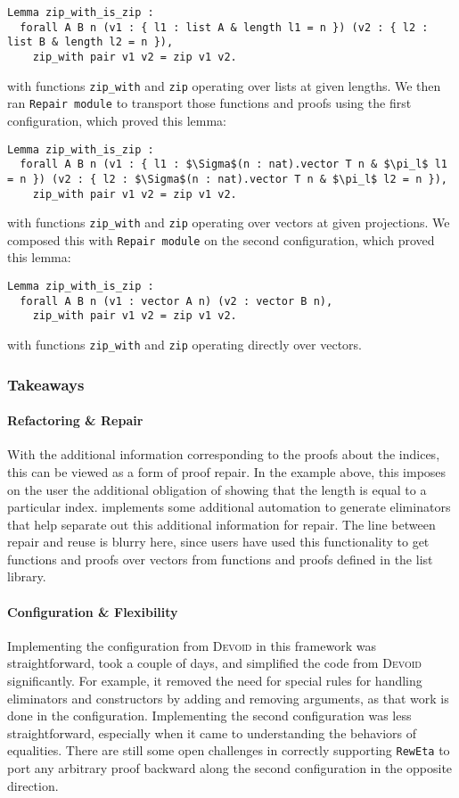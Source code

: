 \begin{lstlisting}
Lemma zip_with_is_zip :
  forall A B n (v1 : { l1 : list A & length l1 = n }) (v2 : { l2 : list B & length l2 = n }),
    zip_with pair v1 v2 = zip v1 v2.
\end{lstlisting}
with functions \lstinline{zip_with} and \lstinline{zip} operating over lists at given lengths.
We then ran \lstinline{Repair module} to transport those functions and proofs using the first
configuration, which proved this lemma:

\begin{lstlisting}
Lemma zip_with_is_zip :
  forall A B n (v1 : { l1 : $\Sigma$(n : nat).vector T n & $\pi_l$ l1 = n }) (v2 : { l2 : $\Sigma$(n : nat).vector T n & $\pi_l$ l2 = n }),
    zip_with pair v1 v2 = zip v1 v2.
\end{lstlisting}
with functions \lstinline{zip_with} and \lstinline{zip} operating over vectors at given projections.
We composed this with \lstinline{Repair module} on the second configuration,
which proved this lemma:

\begin{lstlisting}
Lemma zip_with_is_zip :
  forall A B n (v1 : vector A n) (v2 : vector B n),
    zip_with pair v1 v2 = zip v1 v2.
\end{lstlisting}
with functions \lstinline{zip_with} and \lstinline{zip} operating directly over vectors.

\subsubsection{Takeaways}

\paragraph{Refactoring \& Repair}
With the additional information corresponding to the proofs about the indices, this can be viewed
as a form of proof repair. In the example above, this imposes on the user the additional
obligation of showing that the length is equal to a particular index.
\toolname implements some additional automation to generate eliminators that help separate out this additional information
for repair. The line between repair and reuse is blurry here, since users have used this
functionality to get functions and proofs over vectors from functions and proofs defined in the list library.

\paragraph{Configuration \& Flexibility}
Implementing the configuration from \textsc{Devoid} in this framework was straightforward,
took a couple of days, and simplified the code from \textsc{Devoid} significantly.
For example, it removed the need for special rules for handling eliminators and constructors
by adding and removing arguments,
as that work is done in the configuration.
Implementing the second configuration was less straightforward,
especially when it came to understanding the behaviors of equalities.
There are still some open challenges in correctly supporting \lstinline{RewEta} to port any arbitrary
proof backward along the second configuration in the opposite direction.

